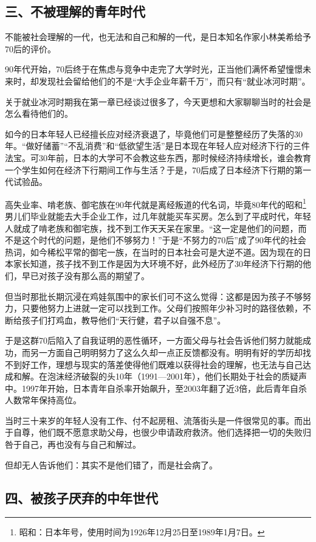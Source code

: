 \subsection{三、不被理解的青年时代}

不能被社会理解的一代，也无法和自己和解的一代，是日本知名作家小林美希给予70后的评价。

90年代开始，70后终于在焦虑与竞争中走完了大学时光，正当他们满怀希望憧憬未来时，却发现社会留给他们的不是“大手企业年薪千万”，而只有“就业冰河时期”。

关于就业冰河时期我在第一章已经谈过很多了，今天更想和大家聊聊当时的社会是怎么看待他们的。

如今的日本年轻人已经擅长应对经济衰退了，毕竟他们可是整整经历了失落的30年。“做好储蓄”“不乱消费”和“低欲望生活”是日本现在年轻人应对经济下行的三件法宝。可30年前，日本的大学可不会教这些东西，那时候经济持续增长，谁会教育一个学生如何在经济下行期间工作与生活？于是，70后成了日本经济下行期的第一代试验品。

高失业率、啃老族、御宅族在90年代就是离经叛道的代名词，毕竟80年代的昭和\footnote{昭和：日本年号，使用时间为1926年12月25日至1989年1月7日。}男儿们毕业就能去大手企业工作，过几年就能买车买房。怎么到了平成时代，年轻人就成了啃老族和御宅族，找不到工作天天呆在家里。“这一定是他们的问题，而不是这个时代的问题，是他们不够努力！”于是“不努力的70后”成了90年代的社会热词，如今稀松平常的御宅一族，在当时的日本社会可是大逆不道。因为现在的日本家长知道，孩子找不到工作是因为大环境不好，此外经历了30年经济下行期的他们，早已对孩子没有那么高的期望了。

但当时那批长期沉浸在鸡娃氛围中的家长们可不这么觉得：这都是因为孩子不够努力，只要他努力上进就一定可以找到工作。父母们按照年少补习时的路径依赖，不断给孩子们打鸡血，教导他们“天行健，君子以自强不息”。

于是这群70后陷入了自我证明的恶性循环，一方面父母与社会告诉他们努力就能成功，而另一方面自己明明努力了这么久却一点正反馈都没有。明明有好的学历却找不到好工作，理想与现实的落差使得他们既难以获得社会的理解，也无法与自己达成和解。在泡沫经济破裂的头10年（1991—2001年），他们长期处于社会的质疑声中。1997年开始，日本青年自杀率开始飙升，至2003年翻了近3倍，此后青年自杀人数常年保持高位。

当时三十来岁的年轻人没有工作、付不起房租、流落街头是一件很常见的事。而出于自尊，他们既不愿意求助父母，也很少申请政府救济。他们选择把一切的失败归咎于自己，再也没有与自己和解过。

但却无人告诉他们：其实不是他们错了，而是社会病了。

\subsection{四、被孩子厌弃的中年世代}

